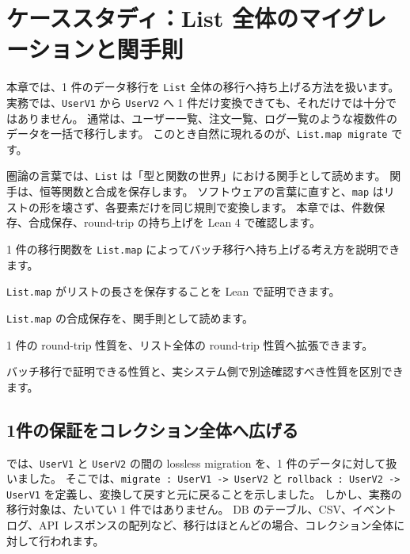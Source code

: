 \chapter{ケーススタディ：List 全体のマイグレーションと関手則}
\label{chap:ch30-list-migration-functor-laws}

\begin{chapterabstract}
本章では、1 件のデータ移行を \texttt{List} 全体の移行へ持ち上げる方法を扱います。
実務では、\texttt{UserV1} から \texttt{UserV2} へ 1 件だけ変換できても、それだけでは十分ではありません。
通常は、ユーザー一覧、注文一覧、ログ一覧のような複数件のデータを一括で移行します。
このとき自然に現れるのが、\texttt{List.map migrate} です。

圏論の言葉では、\texttt{List} は「型と関数の世界」における関手として読めます。
関手は、恒等関数と合成を保存します。
ソフトウェアの言葉に直すと、\texttt{map} はリストの形を壊さず、各要素だけを同じ規則で変換します。
本章では、件数保存、合成保存、round-trip の持ち上げを Lean 4 で確認します。
\end{chapterabstract}

\begin{learninggoals}
\item 1 件の移行関数を \texttt{List.map} によってバッチ移行へ持ち上げる考え方を説明できます。
\item \texttt{List.map} がリストの長さを保存することを Lean で証明できます。
\item \texttt{List.map} の合成保存を、関手則として読めます。
\item 1 件の round-trip 性質を、リスト全体の round-trip 性質へ拡張できます。
\item バッチ移行で証明できる性質と、実システム側で別途確認すべき性質を区別できます。
\end{learninggoals}

\section{1件の保証をコレクション全体へ広げる}

では、\texttt{UserV1} と \texttt{UserV2} の間の lossless migration を、1 件のデータに対して扱いました。
そこでは、\texttt{migrate : UserV1 -> UserV2} と \texttt{rollback : UserV2 -> UserV1} を定義し、変換して戻すと元に戻ることを示しました。
しかし、実務の移行対象は、たいてい 1 件ではありません。
DB のテーブル、CSV、イベントログ、API レスポンスの配列など、移行はほとんどの場合、コレクション全体に対して行われます。

